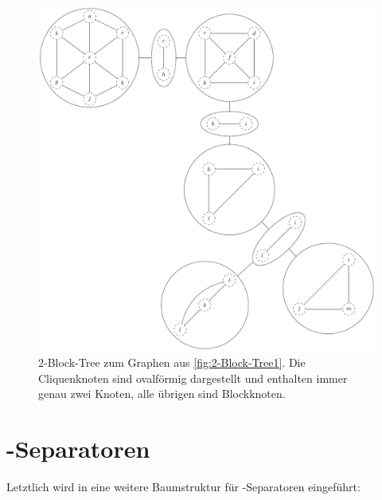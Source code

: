 \newpage

\begin{figure}[H]
  \centering
  \includegraphics[width=\textwidth,height=\textheight,keepaspectratio]{bilder/2-Block-Tree2.pdf}
  \caption{$2$-Block-Tree zum Graphen aus \Abb \ref{fig:2-Block-Tree1}.
           Die Cliquenknoten sind ovalförmig dargestellt und enthalten immer genau zwei Knoten, alle übrigen sind Blockknoten.}
  \label{fig:2-Block-Tree2}
\end{figure}

\newpage

\section{\dd-Separatoren}

Letztlich wird in \cite{ReL08} eine weitere Baumstruktur für \dd-Separatoren eingeführt:

